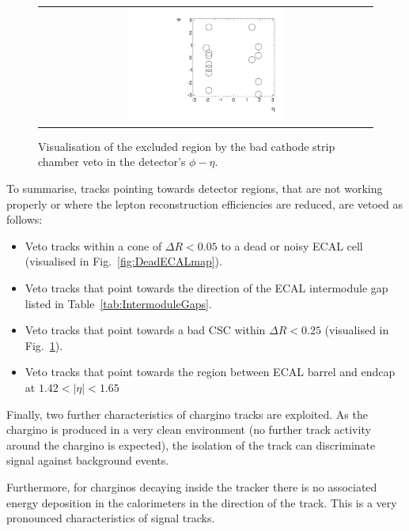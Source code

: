 \begin{figure}[!b]
  \centering 
  \begin{tabular}{c}
    \includegraphics[width=0.49\textwidth]{figures/analysis/AnalysisSelection/BadCSCMap2.pdf}
  \end{tabular}
  \caption{Visualisation of the excluded region by the bad cathode strip chamber veto in the detector's $\phi - \eta$.}
  \label{fig:BadCSCMap}
\vspace{30pt}
\end{figure}

To summarise, tracks pointing towards detector regions, that are not working properly or where the lepton reconstruction efficiencies are reduced, are vetoed as follows:
\begin{itemize}
\renewcommand{\labelitemi}{\footnotesize{\ding{118}}}
\item Veto tracks within a cone of $\Delta R<0.05$ to a dead or noisy ECAL cell (visualised in Fig.~\ref{fig:DeadECALmap}).
\item Veto tracks that point towards the direction of the ECAL intermodule gap listed in Table~\ref{tab:IntermoduleGaps}.
\item Veto tracks that point towards a bad CSC within $\Delta R<0.25$ (visualised in Fig.~\ref{fig:BadCSCMap}).
\item Veto tracks that point towards the region between ECAL barrel and endcap at $1.42<|\eta|<1.65$
\end{itemize}



Finally, two further characteristics of chargino tracks are exploited.
As the chargino is produced in a very clean environment (no further track activity around the chargino is expected), the isolation of the track can discriminate signal against background events.

Furthermore, for charginos decaying inside the tracker there is no associated energy deposition in the calorimeters in the direction of the track.
This is a very pronounced characteristics of signal tracks.

